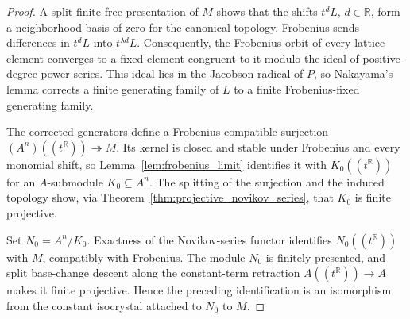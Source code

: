 \begin{proof}
  \leanok
  A split finite-free presentation of $M$ shows that the shifts
  $t^dL$, $d\in\mathbb{R}$, form a neighborhood basis of zero for the
  canonical topology. Frobenius sends differences in $t^dL$ into
  $t^{\lambda d}L$. Consequently, the Frobenius orbit of every lattice
  element converges to a fixed element congruent to it modulo the ideal of
  positive-degree power series.  This ideal lies in the Jacobson radical of
  $P$, so Nakayama's lemma corrects a finite generating family of $L$ to a
  finite Frobenius-fixed generating family.

  The corrected generators define a Frobenius-compatible surjection
  $(A^n)((t^{\mathbb{R}}))\twoheadrightarrow M$. Its kernel is closed and
  stable under Frobenius and every monomial shift, so
  Lemma~\ref{lem:frobenius_limit} identifies it with
  $K_0((t^{\mathbb{R}}))$ for an $A$-submodule $K_0\subseteq A^n$.
  The splitting of the surjection and the induced topology show, via
  Theorem~\ref{thm:projective_novikov_series}, that $K_0$ is finite
  projective.

  Set $N_0=A^n/K_0$. Exactness of the Novikov-series functor identifies
  $N_0((t^{\mathbb{R}}))$ with $M$, compatibly with Frobenius. The module
  $N_0$ is finitely presented, and split base-change descent along the
  constant-term retraction
  $A((t^{\mathbb{R}}))\to A$ makes it finite projective. Hence the preceding
  identification is an isomorphism from the constant isocrystal attached to
  $N_0$ to $M$.
\end{proof}

